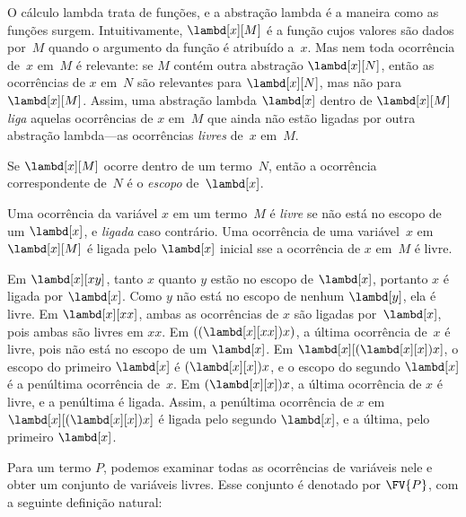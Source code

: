 \documentclass[../../../include/open-logic-section]{subfiles}
\begin{document}

O cálculo lambda trata de funções, e a abstração lambda é a maneira como as
funções surgem. Intuitivamente, $\lambd[x][M]$ é a função cujos valores são
dados por~$M$ quando o argumento da função é atribuído a~$x$. Mas nem toda
ocorrência de~$x$ em~$M$ é relevante: se $M$ contém outra abstração
$\lambd[x][N]$, então as ocorrências de $x$ em~$N$ são relevantes para
$\lambd[x][N]$, mas não para $\lambd[x][M]$. Assim, uma abstração lambda
$\lambd[x]$ dentro de $\lambd[x][M]$ \emph{liga} aquelas ocorrências de $x$
em~$M$ que ainda não estão ligadas por outra abstração lambda---as
ocorrências \emph{livres} de~$x$ em~$M$.

\begin{defn}[Escopo]
Se $\lambd[x][M]$ ocorre dentro de um termo~$N$, então a ocorrência
correspondente de~$N$ é o \emph{escopo} de~$\lambd[x]$.
\end{defn}


\begin{defn}
  Uma ocorrência da variável $x$ em um termo~$M$ é \emph{livre} se não está
  no escopo de um $\lambd[x]$, e \emph{ligada} caso contrário. Uma
  ocorrência de uma variável~$x$ em $\lambd[x][M]$ é ligada pelo
  $\lambd[x]$ inicial sse a ocorrência de $x$ em~$M$ é livre.
\end{defn}

\begin{ex}
  Em $\lambd[x][x y]$, tanto $x$ quanto $y$ estão no escopo de $\lambd[x]$,
  portanto $x$ é ligada por $\lambd[x]$. Como $y$ não está no escopo de
  nenhum $\lambd[y]$, ela é livre. Em $\lambd[x][x x]$, ambas as ocorrências
  de $x$ são ligadas por~$\lambd[x]$, pois ambas são livres em $xx$. Em
  $((\lambd[x][xx])x)$, a última ocorrência de~$x$ é livre, pois não está no
  escopo de um $\lambd[x]$. Em $\lambd[x][(\lambd[x][x])x]$, o escopo do
  primeiro $\lambd[x]$ é $(\lambd[x][x])x$, e o escopo do segundo
  $\lambd[x]$ é a penúltima ocorrência de~$x$. Em $(\lambd[x][x])x$, a
  última ocorrência de $x$ é livre, e a penúltima é ligada. Assim, a
  penúltima ocorrência de $x$ em $\lambd[x][(\lambd[x][x])x]$ é ligada pelo
  segundo $\lambd[x]$, e a última, pelo primeiro $\lambd[x]$.
\end{ex}

Para um termo $P$, podemos examinar todas as ocorrências de variáveis nele e
obter um conjunto de variáveis livres. Esse conjunto é denotado por
$\FV{P}$, com a seguinte definição natural:
\end{document}
